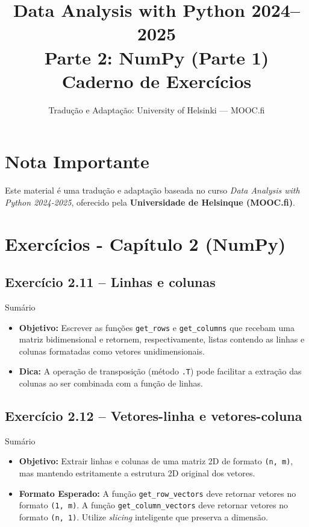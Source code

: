 \documentclass[11pt,a4paper]{article}
\title{\textbf{Data Analysis with Python 2024--2025}\\Parte 2: NumPy (Parte 1)\\\large Caderno de Exercícios}
\author{Tradução e Adaptação: University of Helsinki --- MOOC.fi}
\date{}
\begin{document}
\maketitle

\section*{Nota Importante}
Este material é uma tradução e adaptação baseada no curso \textit{Data Analysis with Python 2024-2025}, oferecido pela \textbf{Universidade de Helsinque (MOOC.fi)}.

\tableofcontents
\newpage

\section{Exercícios - Capítulo 2 (NumPy)}

\subsection*{Exercício 2.11 -- Linhas e colunas}

\begin{exercicio}{Sumário}
\begin{itemize}
    \item \textbf{Objetivo:} Escrever as funções \texttt{get\_rows} e \texttt{get\_columns} que recebam uma matriz bidimensional e retornem, respectivamente, listas contendo as linhas e colunas formatadas como vetores unidimensionais.
    \item \textbf{Dica:} A operação de transposição (método \texttt{.T}) pode facilitar a extração das colunas ao ser combinada com a função de linhas.
\end{itemize}
\end{exercicio}

\subsection*{Exercício 2.12 -- Vetores-linha e vetores-coluna}

\begin{exercicio}{Sumário}
\begin{itemize}
    \item \textbf{Objetivo:} Extrair linhas e colunas de uma matriz 2D de formato \texttt{(n, m)}, mas mantendo estritamente a estrutura 2D original dos vetores.
    \item \textbf{Formato Esperado:} A função \texttt{get\_row\_vectors} deve retornar vetores no formato \texttt{(1, m)}. A função \texttt{get\_column\_vectors} deve retornar vetores no formato \texttt{(n, 1)}. Utilize \textit{slicing} inteligente que preserva a dimensão.
\end{itemize}
\end{exercicio}
\end{document}
